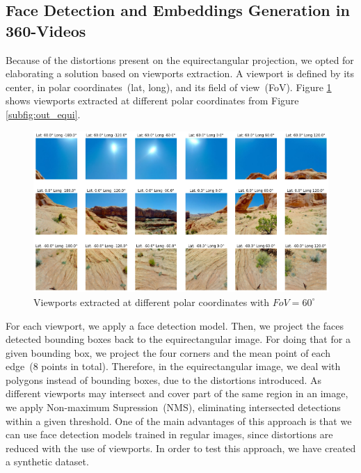 \subsection{Face Detection and Embeddings Generation in 360-Videos}
\label{subsec:360_adaptations}

Because of the distortions present on the equirectangular projection, we opted for elaborating a solution based on viewports extraction. A viewport is defined by its center, in polar coordinates~(lat, long), and its field of view~(FoV). Figure \ref{fig:viewports} shows viewports extracted at different polar coordinates from Figure \ref{subfig:out_equi}.

\begin{figure}[!ht]
    \centering
    \includegraphics[width=1\textwidth]{img/viewports.png}
    \caption{Viewports extracted at different polar coordinates with $FoV = 60^{\circ}$}
    \label{fig:viewports}
\end{figure}

For each viewport, we apply a face detection model. 
Then, we project the faces detected bounding boxes back to the equirectangular image. For doing that for a given bounding box, we project the four corners and the mean point of each edge~(8 points in total). Therefore, in the equirectangular image, we deal with polygons instead of bounding boxes, due to the distortions introduced. As different viewports may intersect and cover part of the same region in an image, we apply Non-maximum Supression~(NMS), eliminating intersected detections within a given threshold. One of the main advantages of this approach is that we can use face detection models trained in regular images, since distortions are reduced with the use of viewports. In order to test this approach, we have created a synthetic dataset.

